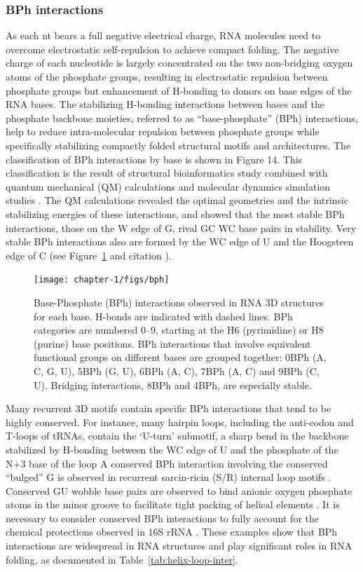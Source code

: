 \subsubsection{BPh interactions}

As each nt bears a full negative electrical charge, RNA molecules need to
overcome electrostatic self-repulsion to achieve compact folding. The negative
charge of each nucleotide is largely concentrated on the two non-bridging oxygen
atoms of the phosphate groups, resulting in electrostatic repulsion between
phosphate groups but enhancement of H-bonding to donors on base edges of the RNA
bases.  The stabilizing H-bonding interactions between bases and the phosphate
backbone moieties, referred to as ``base-phosphate'' (BPh) interactions, help to
reduce intra-molecular repulsion between phosphate groups while specifically
stabilizing compactly folded structural motifs and architectures. The
classification of BPh interactions by base is shown in Figure 14. This
classification is the result of structural bioinformatics study combined with
quantum mechanical (QM) calculations and molecular dynamics simulation studies
\cite{Zirbel2009, Zgarbova2011a}. The QM calculations revealed the optimal
geometries and the intrinsic stabilizing energies of these interactions, and
showed that the most stable BPh interactions, those on the W edge of G, rival GC
WC base pairs in stability. Very stable BPh interactions also are formed by the
WC edge of U and the Hoogsteen edge of C (see Figure~\ref{fig:bph} and citation
\cite{Zirbel2009}).

\begin{figure}
  \texttt{[image: chapter-1/figs/bph]}
  \caption{Base-Phosphate (BPh) interactions observed in RNA 3D structures for
    each base. H-bonds are indicated with dashed lines. BPh categories are
    numbered 0–9, starting at the H6 (pyrimidine) or H8 (purine) base positions.
    BPh interactions that involve equivalent functional groups on different
    bases are grouped together: 0BPh (A, C, G, U), 5BPh (G, U), 6BPh (A, C),
    7BPh (A, C) and 9BPh (C, U). Bridging interactions, 8BPh and 4BPh, are
  especially stable.}
  \label{fig:bph}
\end{figure}

Many recurrent 3D motifs contain specific BPh interactions that tend to be
highly conserved. For instance, many hairpin loops, including the anti-codon and
T-loops of tRNAs, contain the ‘U-turn' submotif, a sharp bend in the backbone
stabilized by H-bonding between the WC edge of U and the phosphate of the N+3
base of the loop \cite{Quigley1976} A conserved BPh interaction involving the
conserved ``bulged'' G is observed in recurrent sarcin-ricin (S/R) internal loop
motifs \cite{Correll1998}. Conserved GU wobble base pairs are observed to bind
anionic oxygen phosphate atoms in the minor groove to facilitate tight packing
of helical elements \cite{Mokdad2006b}. It is necessary to consider conserved
BPh interactions to fully account for the chemical protections observed in 16S
rRNA \cite{Merryman1999, Stern1988}. These examples show that BPh interactions
are widespread in RNA structures and play significant roles in RNA folding, as
documented in Table~\ref{tab:helix-loop-inter}.

